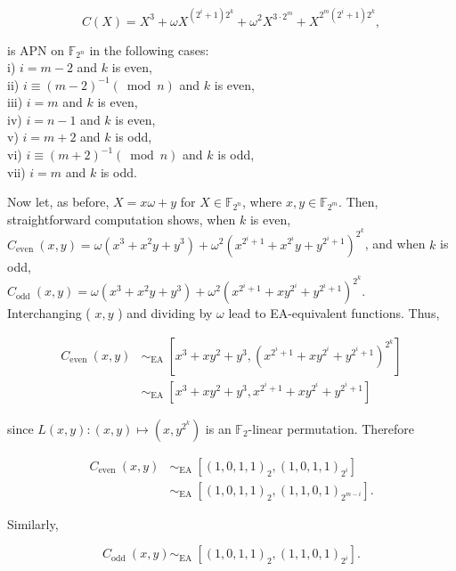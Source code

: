\documentclass[10pt]{article}
\begin{document}
$$
C(X)=X^{3}+\omega X^{\left(2^{i}+1\right) 2^{k}}+\omega^{2} X^{3 \cdot 2^{m}}+X^{2^{m}\left(2^{i}+1\right) 2^{k}},
$$

is APN on $\mathbb{F}_{2^{n}}$ in the following cases:\\
i) $i=m-2$ and $k$ is even,\\
ii) $i \equiv(m-2)^{-1}(\bmod n)$ and $k$ is even,\\
iii) $i=m$ and $k$ is even,\\
iv) $i=n-1$ and $k$ is even,\\
v) $i=m+2$ and $k$ is odd,\\
vi) $i \equiv(m+2)^{-1}(\bmod n)$ and $k$ is odd,\\
vii) $i=m$ and $k$ is odd.

Now let, as before, $X=x \omega+y$ for $X \in \mathbb{F}_{2^{n}}$, where $x, y \in \mathbb{F}_{2^{m}}$. Then, straightforward computation shows, when $k$ is even,\\
$C_{\text {even }}(x, y)=\omega\left(x^{3}+x^{2} y+y^{3}\right)+\omega^{2}\left(x^{2^{i}+1}+x^{2^{i}} y+y^{2^{i}+1}\right)^{2^{k}}$, and when $k$ is odd,\\
$C_{\text {odd }}(x, y)=\omega\left(x^{3}+x^{2} y+y^{3}\right)+\omega^{2}\left(x^{2^{i}+1}+x y^{2^{i}}+y^{2^{i}+1}\right)^{2^{k}}$.\\
Interchanging ( $x, y$ ) and dividing by $\omega$ lead to EA-equivalent functions. Thus,

$$
\begin{aligned}
C_{\text {even }}(x, y) & \sim_{\text {EA }}\left[x^{3}+x y^{2}+y^{3},\left(x^{2^{i}+1}+x y^{2^{i}}+y^{2^{i}+1}\right)^{2^{k}}\right] \\
& \sim_{\text {EA }}\left[x^{3}+x y^{2}+y^{3}, x^{2^{i}+1}+x y^{2^{i}}+y^{2^{i}+1}\right]
\end{aligned}
$$

since $L(x, y):(x, y) \mapsto\left(x, y^{2^{k}}\right)$ is an $\mathbb{F}_{2}$-linear permutation. Therefore

$$
\begin{aligned}
C_{\text {even }}(x, y) & \sim_{\text {EA }}\left[(1,0,1,1)_{2},(1,0,1,1)_{2^{i}}\right] \\
& \sim_{\text {EA }}\left[(1,0,1,1)_{2},(1,1,0,1)_{2^{m-i}}\right] .
\end{aligned}
$$

Similarly,

$$
C_{\text {odd }}(x, y) \sim_{\text {EA }}\left[(1,0,1,1)_{2},(1,1,0,1)_{2^{i}}\right] .
$$
\end{document}
